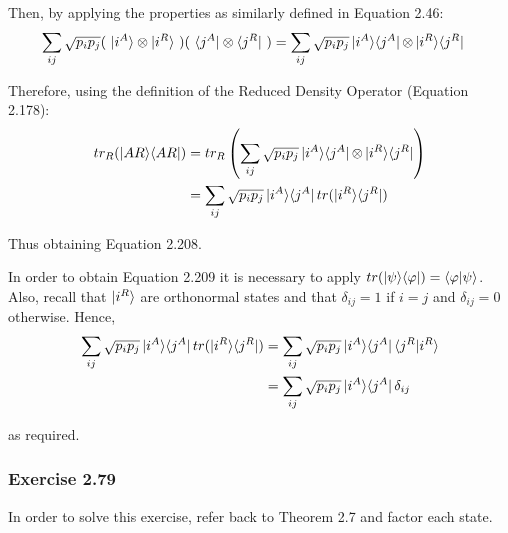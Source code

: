 Then, by applying the properties as similarly defined in Equation 2.46:
\begin{align}
    \sum_{ij} \sqrt{p_i p_j} (\ \ket{i^A} \otimes \ket{i^R}\ )
        (\ \bra{j^A} \otimes \bra{j^R}\ ) &=
        \sum_{ij} \sqrt{p_i p_j} \mathop{\mathinner{ |{i^A}\rangle \langle{j^A}|}} \otimes \mathop{\mathinner{ |{i^R}\rangle \langle{j^R}|}}
\end{align}

Therefore, using the definition of the Reduced Density Operator (Equation 2.178):
\begin{align}
    tr_R(\mathop{\mathinner{ |{AR}\rangle \langle{AR}|}}) &= tr_R \left( \sum_{ij} \sqrt{p_i p_j}
        \mathop{\mathinner{ |{i^A}\rangle \langle{j^A}|}} \otimes \mathop{\mathinner{ |{i^R}\rangle \langle{j^R}|}} \right) \\
    &= \sum_{ij} \sqrt{p_i p_j} \mathop{\mathinner{ |{i^A}\rangle \langle{j^A}|}} tr(\mathop{\mathinner{ |{i^R}\rangle \langle{j^R}|}}) \\
\end{align}

Thus obtaining Equation 2.208.

In order to obtain Equation 2.209 it is necessary to apply
\hyperref[sec:nielsen-and-chuang-trace-of-ketbra-equals-braket]
{$tr(\mathop{\mathinner{ |{\psi}\rangle \langle{\varphi}|}}) = \mathop{\mathinner{ \langle{\varphi}|{\psi}\rangle}}$}.
Also, recall that $\ket{i^R}$ are orthonormal states and that
$\delta_{ij} = 1$ if $i = j$ and $\delta_{ij} = 0$ otherwise.
Hence,
\begin{align}
    \sum_{ij} \sqrt{p_i p_j} \mathop{\mathinner{ |{i^A}\rangle \langle{j^A}|}} tr(\mathop{\mathinner{ |{i^R}\rangle \langle{j^R}|}}) &=
        \sum_{ij} \sqrt{p_i p_j} \mathop{\mathinner{ |{i^A}\rangle \langle{j^A}|}} \mathop{\mathinner{ \langle{j^R}|{i^R}\rangle}} \\
    &= \sum_{ij} \sqrt{p_i p_j} \mathop{\mathinner{ |{i^A}\rangle \langle{j^A}|}} \delta_{ij}
\end{align}

as required.

\subsubsection{Exercise 2.79}
In order to solve this exercise, refer back to Theorem 2.7 and
factor each state.

